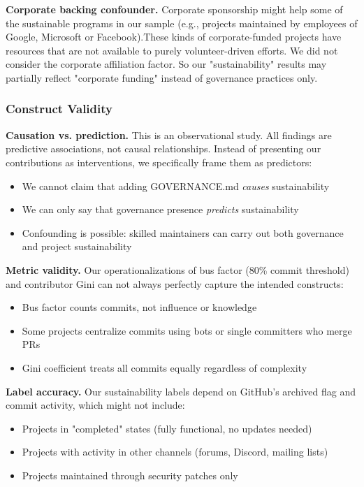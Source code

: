 \documentclass[conference]{IEEEtran}
\begin{document}
\textbf{Corporate backing confounder.} Corporate sponsorship might help some of the sustainable programs in our sample (e.g., projects maintained by employees of Google, Microsoft or Facebook).These kinds of corporate-funded projects have resources that are not available to purely volunteer-driven efforts. We did not consider the corporate affiliation factor. So our "sustainability" results may partially reflect "corporate funding" instead of governance practices only.

\subsubsection{Construct Validity}

\textbf{Causation vs. prediction.} This is an observational study. All findings are predictive associations, not causal relationships. Instead of presenting our contributions as interventions, we specifically frame them as predictors:
\begin{itemize}
    \item We cannot claim that adding GOVERNANCE.md \textit{causes} sustainability
    \item We can only say that governance presence \textit{predicts} sustainability
    \item Confounding is possible: skilled maintainers can carry out both governance and project sustainability
\end{itemize}

\textbf{Metric validity.} Our operationalizations of bus factor (80\% commit threshold) and contributor Gini can not always perfectly capture the intended constructs:
\begin{itemize}
    \item Bus factor counts commits, not influence or knowledge
    \item Some projects centralize commits using bots or single committers who merge PRs
    \item Gini coefficient treats all commits equally regardless of complexity
\end{itemize}

\textbf{Label accuracy.} Our sustainability labels depend on GitHub's archived flag and commit activity, which might not include:
\begin{itemize}
    \item Projects in "completed" states (fully functional, no updates needed)
    \item Projects with activity in other channels (forums, Discord, mailing lists)
    \item Projects maintained through security patches only
\end{itemize}
\end{document}

